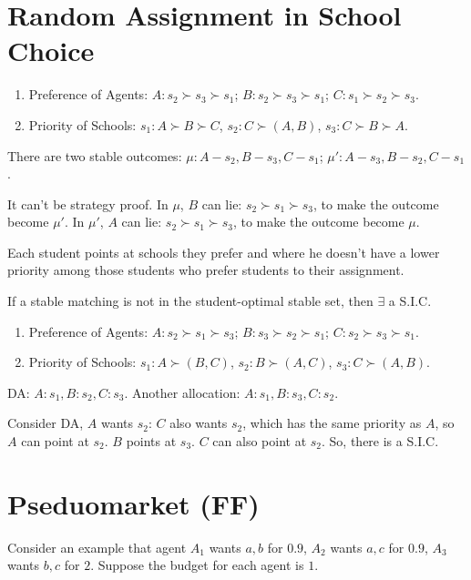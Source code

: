 \documentclass[11pt]{elegantbook}
\begin{document}
\section{Random Assignment in School Choice}
\begin{example}
    \begin{enumerate}[$\circ$]
        \item Preference of Agents: $A: s_2\succ s_3\succ s_1$; $B: s_2\succ s_3\succ s_1$; $C: s_1\succ s_2\succ s_3$.
        \item Priority of Schools: $s_1: A\succ B\succ C$, $s_2: C\succ (A,B)$, $s_3: C\succ B\succ A$.
    \end{enumerate}
    There are two stable outcomes: $\mu: A-s_2, B-s_3, C-s_1$; $\mu': A-s_3, B-s_2, C-s_1$.

    It can't be strategy proof. In $\mu$, $B$ can lie: $s_2\succ s_1\succ s_3$, to make the outcome become $\mu'$. In $\mu'$, $A$ can lie: $s_2\succ s_1\succ s_3$, to make the outcome become $\mu$.
\end{example}

\begin{definition}
    \normalfont
    Each student points at schools they prefer and where he doesn't have a lower priority among those students who prefer students to their assignment.
\end{definition}

\begin{theorem}
    If a stable matching is not in the student-optimal stable set, then $\exists$ a S.I.C.
\end{theorem}
\begin{example}
    \begin{enumerate}[$\circ$]
        \item Preference of Agents: $A: s_2\succ s_1\succ s_3$; $B: s_3\succ s_2\succ s_1$; $C: s_2\succ s_3\succ s_1$.
        \item Priority of Schools: $s_1: A\succ (B,C)$, $s_2: B\succ (A,C)$, $s_3: C\succ (A,B)$.
    \end{enumerate}
    DA: $A:s_1, B:s_2, C:s_3$.
    Another allocation: $A:s_1, B:s_3, C:s_2$.

    Consider DA, $A$ wants $s_2$: $C$ also wants $s_2$, which has the same priority as $A$, so $A$ can point at $s_2$. $B$ points at $s_3$. $C$ can also point at $s_2$. So, there is a S.I.C.
\end{example}


\section{Pseduomarket (FF)}
Consider an example that agent $A_1$ wants $a,b$ for $0.9$, $A_2$ wants $a,c$ for $0.9$, $A_3$ wants $b,c$ for $2$. Suppose the budget for each agent is $1$.
\end{document}
